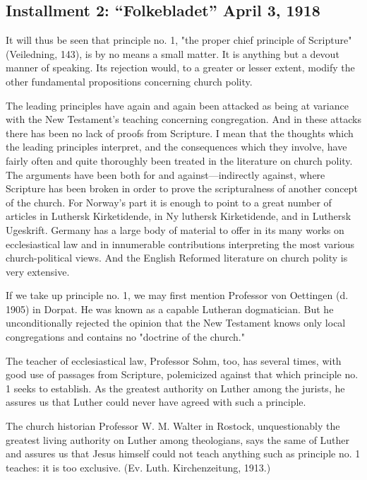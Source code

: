 
\subsection{Installment 2: “Folkebladet” April 3, 1918}

It will thus be seen that principle no. 1, "the proper chief principle of Scripture" (Veiledning, 143), is by no means a small matter. It is anything but a devout manner of speaking. Its rejection would, to a greater or lesser extent, modify the other fundamental propositions concerning church polity.

The leading principles have again and again been attacked as being at variance with the New Testament’s teaching concerning congregation. And in these attacks there has been no lack of proofs from Scripture. I mean that the thoughts which the leading principles interpret, and the consequences which they involve, have fairly often and quite thoroughly been treated in the literature on church polity. The arguments have been both for and against—indirectly against, where Scripture has been broken in order to prove the scripturalness of another concept of the church. For Norway’s part it is enough to point to a great number of articles in Luthersk Kirketidende, in Ny luthersk Kirketidende, and in Luthersk Ugeskrift. Germany has a large body of material to offer in its many works on ecclesiastical law and in innumerable contributions interpreting the most various church-political views. And the English Reformed literature on church polity is very extensive.

If we take up principle no. 1, we may first mention Professor von Oettingen (d. 1905) in Dorpat. He was known as a capable Lutheran dogmatician. But he unconditionally rejected the opinion that the New Testament knows only local congregations and contains no "doctrine of the church."

The teacher of ecclesiastical law, Professor Sohm, too, has several times, with good use of passages from Scripture, polemicized against that which principle no. 1 seeks to establish. As the greatest authority on Luther among the jurists, he assures us that Luther could never have agreed with such a principle.

The church historian Professor W. M. Walter in Rostock, unquestionably the greatest living authority on Luther among theologians, says the same of Luther and assures us that Jesus himself could not teach anything such as principle no. 1 teaches: it is too exclusive. (Ev. Luth. Kirchenzeitung, 1913.)

